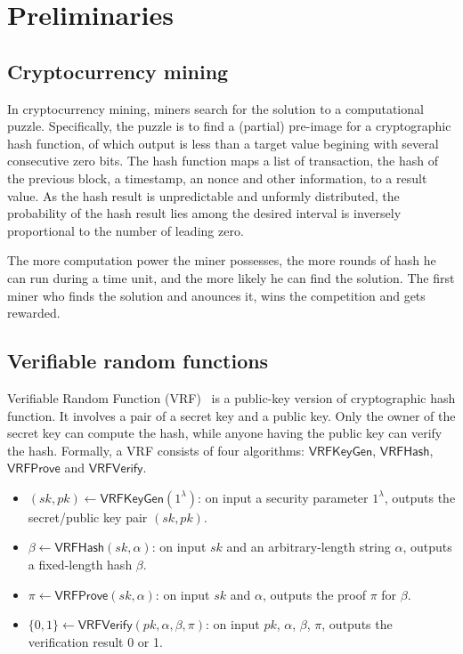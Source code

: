 \section{Preliminaries}

\subsection{Cryptocurrency mining}


In cryptocurrency mining, miners search for the solution to a computational puzzle.
Specifically, the puzzle is to find a (partial) pre-image for a cryptographic hash function, of which output is less than a target value begining with several consecutive zero bits.
The hash function maps a list of transaction, the hash of the previous block, a timestamp, an nonce and other information, to a result value.
As the hash result is unpredictable and unformly distributed, the probability of the hash result lies among the desired interval is inversely proportional to the number of leading zero.

The more computation power the miner possesses, the more rounds of hash he can run during a time unit, and the more likely he can find the solution. The first miner who finds the solution and anounces it, wins the competition and gets rewarded.

\subsection{Verifiable random functions}

Verifiable Random Function (VRF)~\cite{micali1999verifiable} is a public-key version of cryptographic hash function.
It involves a pair of a secret key and a public key.
Only the owner of the secret key can compute the hash, while anyone having the public key can verify the hash.
Formally, a VRF consists of four algorithms: $\mathsf{VRFKeyGen}$, $\mathsf{VRFHash}$, $\mathsf{VRFProve}$ and $\mathsf{VRFVerify}$.

\begin{itemize}
    \item $(sk, pk) \gets \mathsf{VRFKeyGen}(1^{\lambda})$: on input a security parameter $1^{\lambda}$, outputs the secret/public key pair $(sk, pk)$.
    \item $\beta \gets \mathsf{VRFHash}(sk, \alpha)$: on input $sk$ and an arbitrary-length string $\alpha$, outputs a fixed-length hash $\beta$.
    \item $\pi \gets \mathsf{VRFProve}(sk, \alpha)$: on input $sk$ and $\alpha$, outputs the proof $\pi$ for $\beta$.
    \item $\{0, 1\} \gets \mathsf{VRFVerify}(pk, \alpha, \beta, \pi)$: on input $pk$, $\alpha$, $\beta$, $\pi$, outputs the verification result 0 or 1.
\end{itemize}

